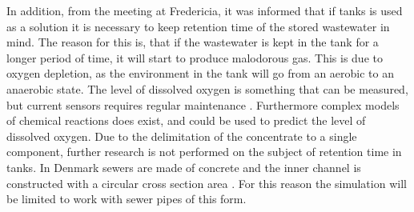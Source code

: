 In addition, from the meeting at Fredericia, it was informed that if tanks is used as a solution it is necessary to keep retention time of the stored wastewater in mind. The reason for this is, that if the wastewater is kept in the tank for a longer period of time, it will start to produce malodorous gas. This is due to oxygen depletion, as the environment in the tank will go from an aerobic to an anaerobic state. The level of dissolved oxygen is something that can be measured, but current sensors requires regular maintenance \cite{dissolved_oxygen_measuring}. 
Furthermore complex models of chemical reactions does exist, and could be used to predict the level of dissolved oxygen.   
Due to the delimitation of the concentrate to a single component, further research is not performed on the subject of retention time in tanks.
In Denmark sewers are made of concrete and the inner channel is constructed with a circular cross section area \cite{betonhaandbogen}. For this reason the simulation will be limited to work with sewer pipes of this form.



